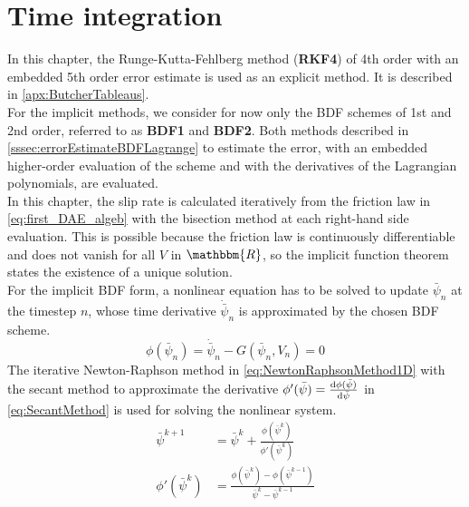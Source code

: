 \section{Time integration}
In this chapter, the Runge-Kutta-Fehlberg method (\textbf{RKF4}) of 4th order with an embedded 5th order error estimate is used as an explicit method. It is described in \autoref{apx:ButcherTableaus}. \\
For the implicit methods, we consider for now only the BDF schemes of 1st and 2nd order, referred to as \textbf{BDF1} and \textbf{BDF2}. Both methods described in \autoref{sssec:errorEstimateBDFLagrange} to estimate the error, with an embedded higher-order evaluation of the scheme and with the derivatives of the Lagrangian polynomials, are evaluated. \\
In this chapter, the slip rate is calculated iteratively from the friction law in \autoref{eq:first_DAE_algeb} with the bisection method at each right-hand side evaluation. This is possible because the friction law is continuously differentiable and does not vanish for all $V$ in $\mathbbm{R}$, so the implicit function theorem states the existence of a unique solution. \\  
For the implicit BDF form, a nonlinear equation has to be solved to update $\bar{\psi}_n$ at the timestep $n$, whose time derivative $\dot{\bar{\psi}}_n$ is approximated by the chosen BDF scheme.
\begin{equation}
\phi(\bar{\psi}_n) = \dot{\bar{\psi}}_n - G(\bar{\psi}_n, V_n) = 0
\end{equation}
The iterative Newton-Raphson method \cite{NewtonRaphsonMethod} in \autoref{eq:NewtonRaphsonMethod1D} with the secant method to approximate the derivative $\phi'(\bar{\psi}) = \dv{\phi(\bar{\psi})}{\bar{\psi}}$ in \autoref{eq:SecantMethod} is used for solving the nonlinear system.
\begin{align}
\label{eq:NewtonRaphsonMethod1D}
\bar{\psi}^{k+1} &= \bar{\psi}^k + \frac{\phi\left(\bar{\psi}^k\right)}{\phi'\left(\bar{\psi}^k\right)} \\
\label{eq:SecantMethod}
\phi'\left(\bar{\psi}^k\right) &= \frac{\phi\left(\bar{\psi}^k\right) - \phi\left(\bar{\psi}^{k-1}\right)}{\bar{\psi}^k - \bar{\psi}^{k-1}}
\end{align}
